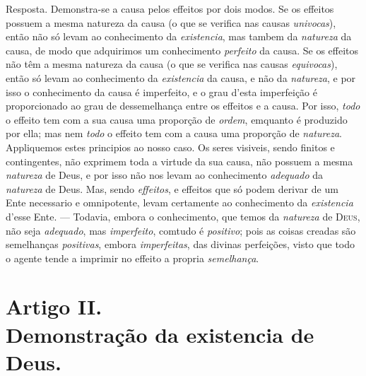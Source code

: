 {Resposta. Demonstra-se a causa pelos effeitos por dois modos. Se os effeitos possuem a
mesma natureza da causa (o que se verifica nas causas \emph{univocas}), então não só
levam ao conhecimento da \emph{existencia}, mas tambem da \emph{natureza} da causa, de
modo que adquirimos um conhecimento \emph{perfeito} da causa. Se os effeitos não têm a
mesma natureza da causa (o que se verifica nas causas \emph{equivocas}), então só levam
ao conhecimento da \emph{existencia} da causa, e não da \emph{natureza}, e por isso o
conhecimento da causa é imperfeito,
 e o grau d'esta imperfeição é proporcionado ao grau de dessemelhança entre os
effeitos e a causa. Por isso, \emph{todo} o effeito tem com a sua causa uma proporção
de \emph{ordem}, emquanto é produzido por ella; mas nem \emph{todo} o effeito tem com a
causa uma proporção de \emph{natureza}. Appliquemos estes principios ao nosso caso. Os
seres visiveis, sendo finitos e contingentes, não exprimem toda a virtude da sua causa,
não possuem a mesma \emph{natureza} de Deus, e por isso não nos levam ao conhecimento
\emph{adequado} da \emph{natureza} de Deus. Mas, sendo \emph{effeitos}, e effeitos que
só podem derivar de um Ente necessario e omnipotente, levam certamente ao conhecimento
da \emph{existencia} d'esse Ente. --- Todavia, embora o conhecimento, que temos da
\emph{natureza} de \textsc{Deus}, não seja \emph{adequado}, mas \emph{imperfeito},
comtudo é \emph{positivo}; pois as coisas creadas são semelhanças \emph{positivas},
embora \emph{imperfeitas}, das divinas perfeições, visto que todo o agente tende a
imprimir no effeito a propria \emph{semelhança}.}


\section*{Artigo II.\\ Demonstração da existencia de Deus.}

